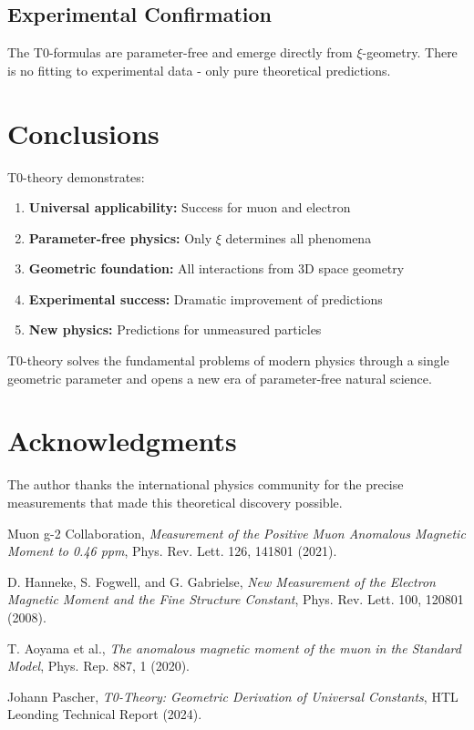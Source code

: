 \documentclass[12pt,a4paper]{article}
\newcommand{\xipar}{\xi}
\begin{document}
	\subsection{Experimental Confirmation}
	
	\begin{important}
		The T0-formulas are parameter-free and emerge directly from $\xipar$-geometry. There is no fitting to experimental data - only pure theoretical predictions.
	\end{important}
	
	\section{Conclusions}
	
	T0-theory demonstrates:
	
	\begin{enumerate}
		\item \textbf{Universal applicability:} Success for muon and electron
		\item \textbf{Parameter-free physics:} Only $\xipar$ determines all phenomena
		\item \textbf{Geometric foundation:} All interactions from 3D space geometry
		\item \textbf{Experimental success:} Dramatic improvement of predictions
		\item \textbf{New physics:} Predictions for unmeasured particles
	\end{enumerate}
	
	\begin{success}
		T0-theory solves the fundamental problems of modern physics through a single geometric parameter and opens a new era of parameter-free natural science.
	\end{success}
	
	\section*{Acknowledgments}
	
	The author thanks the international physics community for the precise measurements that made this theoretical discovery possible.
	
	\begin{thebibliography}{9}
		
		Muon g-2 Collaboration,
		\textit{Measurement of the Positive Muon Anomalous Magnetic Moment to 0.46 ppm},
		Phys. Rev. Lett. 126, 141801 (2021).
		
		D. Hanneke, S. Fogwell, and G. Gabrielse,
		\textit{New Measurement of the Electron Magnetic Moment and the Fine Structure Constant},
		Phys. Rev. Lett. 100, 120801 (2008).
		
		T. Aoyama et al.,
		\textit{The anomalous magnetic moment of the muon in the Standard Model},
		Phys. Rep. 887, 1 (2020).
		
		Johann Pascher,
		\textit{T0-Theory: Geometric Derivation of Universal Constants},
		HTL Leonding Technical Report (2024).
		
	\end{thebibliography}
	
\end{document}
